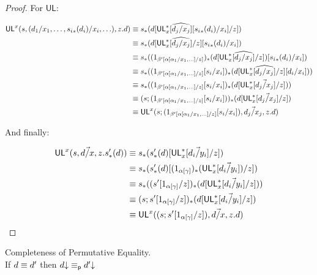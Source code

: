 \begin{proof}
For $\mathsf{UL}$:

\begin{align*}
\mathsf{UL}^{x}_{}(s,(d_1/x_1,\ldots,{s_i}_*(d_i)/x_i,\ldots),z.d) 
&\equiv s_*(d[\mathsf{UL}^*_{x}\widehat{[d_j/x_j]}[{s_i}_*(d_i)/x_i]/z]) \\
&\equiv s_*(d[\mathsf{UL}^*_{x}\widehat{[d_j/x_j]}/z][{s_i}_*(d_i)/x_i]) \\
&\equiv s_*((1_{\beta'[\alpha[\alpha_1/x_1,\ldots]/z]})_*(d[\mathsf{UL}^*_{x}\widehat{[d_j/x_j]}/z])[{s_i}_*(d_i)/x_i]) \\
&\equiv s_*((1_{\beta'[\alpha[\alpha_1/x_1,\ldots]/z]}[s_i/x_i])_*(d[\mathsf{UL}^*_{x}\widehat{[d_j/x_j]}/z][d_i/x_i])) \\
&\equiv s_*((1_{\beta'[\alpha[\alpha_1/x_1,\ldots]/z]}[s_i/x_i])_*(d[\mathsf{UL}^*_{x}[\vec{d_j/x_j}]/z])) \\
&\equiv (s;(1_{\beta'[\alpha[\alpha_1/x_1,\ldots]/z]}[s_i/x_i]))_*(d[\mathsf{UL}^*_{x}[\vec{d_j/x_j}]/z]) \\
&\equiv \mathsf{UL}^{x}_{}(s;(1_{\beta'[\alpha[\alpha_1/x_1,\ldots]/z]}[s_i/x_i]),\vec{d_j/x_j},z.d)
\end{align*}

And finally:

\begin{align*}
\mathsf{UL}^{x}_{}(s,\vec{d/x},z.s'_*(d)) 
&\equiv s_*(s'_*(d)[\mathsf{UL}^*_{x}[\vec{d_i/y_i}]/z]) \\
&\equiv s_*(s'_*(d)[(1_{\alpha[\gamma]})_*(\mathsf{UL}^*_{x}[\vec{d_i/y_i}])/z]) \\
&\equiv s_*((s'[1_{\alpha[\gamma]}/z])_*(d[\mathsf{UL}^*_{x}[\vec{d_i/y_i}]/z])) \\
&\equiv (s;s'[1_{\alpha[\gamma]}/z])_*(d[\mathsf{UL}^*_{x}[\vec{d_i/y_i}]/z]) \\
& \equiv \mathsf{UL}^{x}_{}((s;s'[1_{\alpha[\gamma]}/z]),\vec{d/x},z.d)
\end{align*}
\end{proof}

\begin{conjecture}{Completeness of Permutative Equality.}\\ \label{thm:permutative-completeness}
If $d \equiv d'$ then $d\mathord{\downarrow} \equiv_{\mathsf{p}} d'\mathord{\downarrow}$
\end{conjecture}

